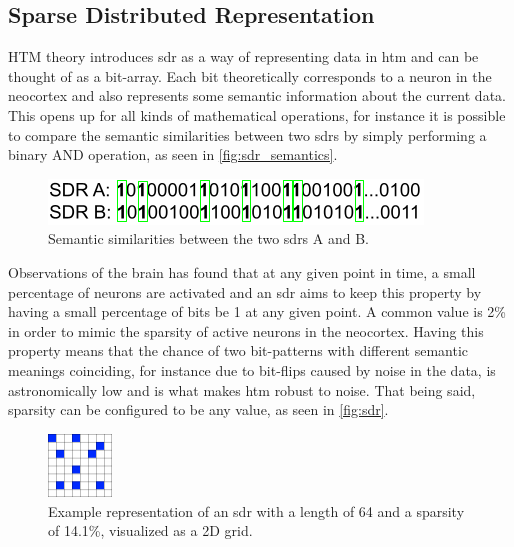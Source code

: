 \subsection{Sparse Distributed Representation}
HTM theory introduces \gls*{sdr} as a way of representing data in \gls*{htm} and can be thought of as a bit-array. Each bit theoretically corresponds to a neuron in the neocortex and also represents some semantic information about the current data. This opens up for all kinds of mathematical operations, for instance it is possible to compare the semantic similarities between two \glspl*{sdr} by simply performing a binary AND operation, as seen in \autoref{fig:sdr_semantics}.
\begin{figure}[htb]
    \centering
    \includegraphics[width=0.7\linewidth]{resources/related_works/sdr-semantics.png}
    \caption[SDR Semantic Comparison]{Semantic similarities between the two \glspl*{sdr} A and B.}
    \label{fig:sdr_semantics}
\end{figure}
\par
Observations of the brain has found that at any given point in time, a small percentage of neurons are activated and an \gls*{sdr} aims to keep this property by having a small percentage of bits be 1 at any given point. A common value is 2\% in order to mimic the sparsity of active neurons in the neocortex. Having this property means that the chance of two bit-patterns with different semantic meanings coinciding, for instance due to bit-flips caused by noise in the data, is astronomically low and is what makes \gls*{htm} robust to noise. That being said, sparsity can be configured to be any value, as seen in \autoref{fig:sdr}.
\begin{figure}[htb]
    \centering
    \includegraphics[width=0.15\textwidth]{resources/related_works/SDR.png}
    \caption[Example SDR]{Example representation of an \gls*{sdr} with a length of 64 and a sparsity of 14.1\%, visualized as a 2D grid.}
    \label{fig:sdr}
\end{figure}
\par

